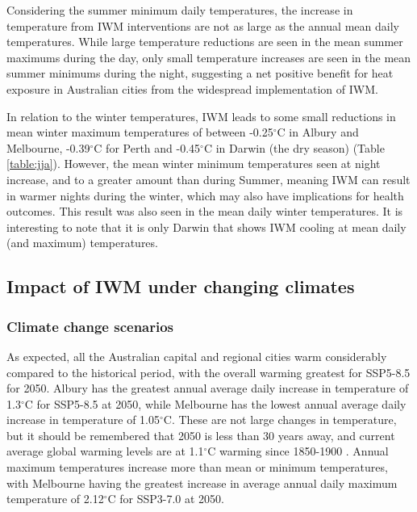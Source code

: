 \documentclass[utf8]{frontiersSCNS} %
\begin{document}
Considering the summer minimum daily temperatures, the increase in temperature from IWM interventions are not as large as the annual mean daily temperatures. While large temperature reductions are seen in the mean summer maximums during the day, only small temperature increases are seen in the mean summer minimums during the night, suggesting a net positive benefit for heat exposure in Australian cities from the widespread implementation of IWM. 

In relation to the winter temperatures, IWM leads to some small reductions in mean winter maximum temperatures of between -0.25$^{\circ}$C in Albury and Melbourne, -0.39$^{\circ}$C for Perth and -0.45$^{\circ}$C in Darwin (the dry season) (Table \ref{table:jja}). However, the mean winter minimum temperatures seen at night increase, and to a greater amount than during Summer, meaning IWM can result in warmer nights during the winter, which may also have implications for health outcomes. This result was also seen in the mean daily winter temperatures. It is interesting to note that it is only Darwin that shows IWM cooling at mean daily (and maximum) temperatures.  

\subsection{Impact of IWM under changing climates }\label{sec:results3}

\subsubsection{Climate change scenarios}\label{sec:results3a}

As expected, all the Australian capital and regional cities warm considerably compared to the historical period, with the overall warming greatest for SSP5-8.5 for 2050. Albury has the greatest annual average daily increase in temperature of 1.3$^{\circ}$C for SSP5-8.5 at 2050, while Melbourne has the lowest annual average daily increase in temperature of 1.05$^{\circ}$C. These are not large changes in temperature, but it should be remembered that 2050 is less than 30 years away, and current average global warming levels are at 1.1$^{\circ}$C warming since 1850-1900 \citep{IPCC2021}. Annual maximum temperatures increase more than mean or minimum temperatures, with Melbourne having the greatest increase in average annual daily maximum temperature of 2.12$^{\circ}$C for SSP3-7.0 at 2050.
\end{document}
